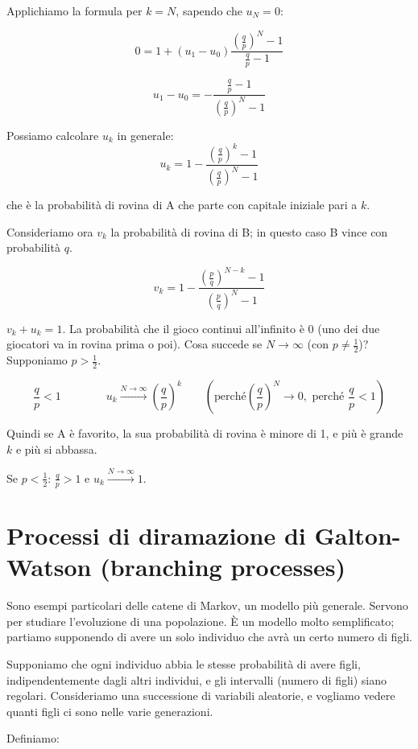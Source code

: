 \documentclass[a4paper,12pt]{book}
\newcommand\ddfrac[2]{\frac{\displaystyle #1}{\displaystyle #2}}
\begin{document}
Applichiamo la formula per $ k = N $, sapendo che $ u_N = 0 $:

$$ 0 = 1 + (u_1 - u_0) \ddfrac{\left(\ddfrac{q}{p}\right)^N - 1}{\ddfrac{q}{p} - 1} $$

$$ u_1 - u_0 = - \ddfrac{\ddfrac{q}{p} - 1}{\left(\ddfrac{q}{p}\right)^N - 1} $$

Possiamo calcolare $ u_k $ in generale:
$$ u_k = 1 - \ddfrac{\left(\ddfrac{q}{p}\right)^k - 1}{\left(\ddfrac{q}{p}\right)^N - 1} $$

che è la probabilità di rovina di A che parte con capitale iniziale pari a $ k $. 

Consideriamo ora $ v_k $ la probabilità di rovina di B; in questo caso B vince con probabilità $ q $.

$$ v_k = 1 - \ddfrac{\left(\ddfrac{p}{q}\right)^{N-k} - 1}{\left(\ddfrac{p}{q}\right)^N - 1} $$

$ v_k + u_k = 1 $. La probabilità che il gioco continui all'infinito è 0 (uno dei due giocatori va in rovina prima o poi). Cosa succede se $ N \to \infty $ (con $ p \ne \frac{1}{2} $)? Supponiamo $ p > \frac{1}{2} $. 

$$ \frac{q}{p} < 1 \qquad \qquad u_k \stackrel{N \to \infty}{\longrightarrow} \left(\frac{q}{p}\right)^k \qquad (\text{perché} \left(\frac{q}{p}\right)^N \to 0, \text{ perché } \frac{q}{p} < 1) $$

Quindi se A è favorito, la sua probabilità di rovina è minore di 1, e più è grande $ k $ e più si abbassa.

Se $ p < \ddfrac{1}{2} $: $ \ddfrac{q}{p} > 1 $ e $ u_k \stackrel{N \to \infty}{\longrightarrow} 1 $.

\section{Processi di diramazione di Galton-Watson (branching processes)}
Sono esempi particolari delle catene di Markov, un modello più generale. Servono per studiare l'evoluzione di una popolazione. È un modello molto semplificato; partiamo supponendo di avere un solo individuo che avrà un certo numero di figli. 

Supponiamo che ogni individuo abbia le stesse probabilità di avere figli, indipendentemente dagli altri individui, e gli intervalli (numero di figli) siano regolari. Consideriamo una successione di variabili aleatorie, e vogliamo vedere quanti figli ci sono nelle varie generazioni.

Definiamo:
\end{document}
